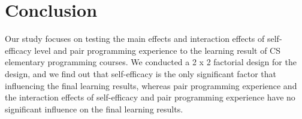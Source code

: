 \documentclass{sigchi}
\begin{document}
\section{Conclusion}
Our study focuses on testing the main effects and interaction effects of self-efficacy level and pair programming experience to the learning result of CS elementary programming courses. We conducted a 2 x 2 factorial design for the design, and we find out that self-efficacy is the only significant factor that influencing the final learning results, whereas pair programming experience and the interaction effects of self-efficacy and pair programming experience have no significant influence on the final learning results.


%
%
%
%
\end{document}
